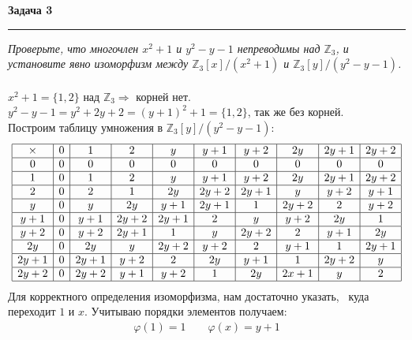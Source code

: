 \documentclass[a4paper,11pt]{article}
\newcommand{\Z}{\mathbb{Z}}
\begin{document}
\textbf{\large Задача 3}
\medskip\hrule\medskip
\textit{Проверьте, что многочлен $ x^2 + 1 $ и $ y^2 - y - 1 $ непреводимы над $ \Z_3 $, и установите явно изоморфизм между $ \Z_3[x]/(x^2 + 1) $ и $ \Z_3[y]/(y^2 - y - 1) $.} \\ \\
$ x^2 + 1 = \{1, 2\} $ над $ \Z_3 \Rightarrow $ корней нет. $ y^2 - y - 1 = y^2 + 2y + 2 = (y + 1)^2 + 1 = \{1, 2\}$, так же без корней. \\[2pt]
Построим таблицу умножения в $ \Z_3[y]/(y^2 - y - 1) $:
\begin{gather*}
	\begin{array}{|c|c|c|c|c|c|c|c|c|c|}
	\hline
	\times	& 0 & 1 & 2 & y & y + 1 & y + 2 & 2y & 2y + 1 & 2y + 2\\
	\hline
	0		& 0 & 0 & 0 & 0 & 0 & 0 & 0 & 0 & 0\\
	\hline
	1		& 0 & 1 & 2 & y & y + 1 & y + 2 & 2y & 2y + 1 & 2y + 2\\
	\hline
	2		& 0 & 2 & 1 & 2y & 2y + 2 & 2y + 1 & y & y + 2 & y + 1\\
	\hline
	y		& 0 & y & 2y & y + 1 & 2y + 1 & 1 & 2y+2 & 2 & y + 2\\
	\hline
	y + 1	& 0 & y + 1 & 2y + 2 & 2y + 1 & 2 & y & y + 2 & 2y & 1\\
	\hline
	y + 2	& 0 & y + 2 & 2y + 1 & 1 & y & 2y+2 & 2 & y + 1 & 2y\\
	\hline
	2y		& 0 & 2y & y & 2y+2 & y +2  & 2 & y+1 & 1 & 2y+1\\
	\hline
	2y + 1	& 0 & 2y + 1 & y + 2 & 2 & 2y & y+1 & 1 & 2y+2 & y\\
	\hline
	2y + 2	& 0 & 2y + 2 & y + 1 & y+2 & 1 & 2y & 2x + 1 & y & 2\\
	\hline
	\end{array}
\end{gather*}
Для корректного определения изоморфизма, нам достаточно указать,  куда переходит $ 1 $ и $ x $. Учитываю порядки элементов получаем:
\begin{gather*}
\varphi(1) = 1 \qquad \varphi(x) = y + 1 
\end{gather*}
\end{document}
